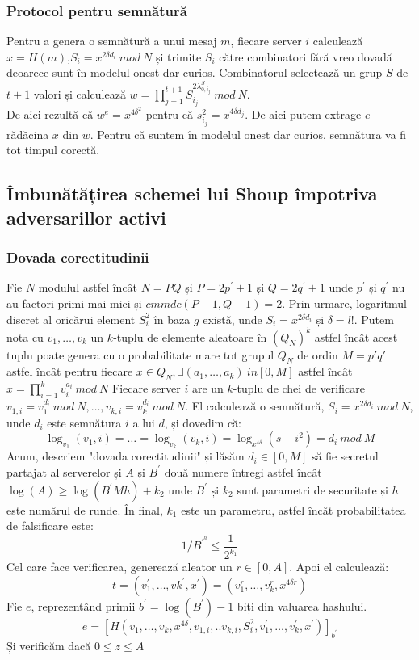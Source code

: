 \documentclass[12pt, oneside]{book}
\begin{document}
\subsubsection{Protocol pentru semnătură}
Pentru a genera o semnătură a unui mesaj $m$, fiecare server $i$ calculează $x=H(m)$,$S_i = x^{2 \delta d_i}  \ mod \ N$ și trimite $S_i$ către combinatori fără vreo dovadă deoarece sunt în modelul onest dar curios. Combinatorul selectează un grup $S$ de $t+1$ valori și calculează $ w = \prod_{j=1}^{t+1} S_{i_j}^{2 \lambda_{0,i_{j}}^{S} } \ mod \ N$. \\
De aici rezultă că $w^{e} = x^{4 \delta^2}$ pentru că $s_{i_j}^{2} = x^{4 \delta d_j}$. De aici putem extrage $e$ rădăcina $x$ din $w$. Pentru că suntem în modelul onest dar curios, semnătura va fi tot timpul corectă.

\subsection{Îmbunătățirea schemei lui Shoup împotriva adversarillor activi}
\subsubsection{Dovada corectitudinii}
Fie $N$ modulul astfel încât $N=PQ$ și $P = 2p^{'} +1 $ și $Q= 2q^{'} +1 $ unde $p^{'}$ și $q^{'}$ nu au factori primi mai mici și $cmmdc(P-1,Q-1)=2$. Prin urmare, logaritmul discret al oricărui element $S_i^{2}$ în baza $g$ există, unde $S_i = x^{2 \delta d_i}$ și $\delta = l!$. Putem nota cu $v_1, \dots ,v_k$ un $k$-tuplu de elemente aleatoare în $(Q_N)^k$ astfel încât acest tuplu poate genera cu o probabilitate mare tot grupul $Q_N$ de ordin $M=p'q'$ astfel încât pentru fiecare $x \in Q_N, \exists (a_1, \dots ,a_k) \ in [0,M] $ astfel încât $x = \prod_{i=1}^{k} v_i^{a_i} \ mod \ N$
Fiecare server $i$ are un $k$-tuplu de chei de verificare $v_{1,i} = v_1^{d_i} \ mod \ N, \dots ,v_{k,i} = v_k^{d_i} \ mod \ N$. El calculează o semnătură, $S_i = x^{2 \delta d_i} \ mod \ N$, unde $d_i$ este semnătura $i$ a lui $d$, și dovedim că:
$$ \log_{v_1} (v_1,i) =  \dots  = \log_{v_k} (v_k,i) = \log_{x^{4 \delta}} (s-{i}^{2}) = d_i \ mod \ M $$
Acum, descriem "dovada corectitudinii" și lăsăm $d_i \in [0,M]$ să fie secretul partajat al serverelor și $A$ și $B^{'}$ două numere întregi astfel încât $\log(A) \geqslant \log(B^{'} Mh) +k_2$ unde $B^{'}$ și $k_2$ sunt parametri de securitate și $h$ este numărul de runde. În final, $k_1$ este un parametru, astfel încăt probabilitatea de falsificare este:
$$1/B^{\prime ^{h}} \leq \frac{1}{2^{k_1}}$$
Cel care face verificarea, generează aleator un $r \in [0,A]$. Apoi el calculează:
$$t= (v_{1}^{'}, \dots ,v{k}^{'},x^{'})=(v_{1}^{r}, \dots ,v_{k}^{r},x^{4 \delta r})$$
Fie $e$, reprezentând primii $b^{'} =\log(B^{'})-1$ biți din valuarea hashului.
$$ e= [H(v_1, \dots ,v_k,x^{4 \delta},v_{1,i},..v_{k,i},S_{i}^{2},v_{1}^{'}, \dots ,v_{k}^{'},x^{'})]_{b^{'}} $$
Și verificăm dacă $0 \leq z \leq A $
\end{document}
